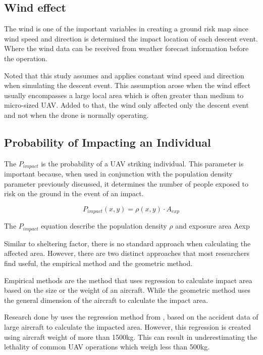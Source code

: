 \documentclass[12pt]{report}
\begin{document}
        \subsection{Wind effect}
        The wind is one of the important variables in creating a ground risk map since wind speed and direction is
        determined the impact location of each descent event. Where the wind data can be received from weather forecast
        information before the operation.
            
        Noted that this study assumes and applies constant wind speed and direction when simulating the descent event.
        This assumption arose when the wind effect usually encompasses a large local area which is often greater than
        medium to micro-sized UAV. Added to that, the wind only affected only the descent event and not when the drone
        is normally operating.
            
        \subsection{Probability of Impacting an Individual}
        The \(P_{impact}\) is the probability of a UAV striking individual. This parameter is important because, when
        used in conjunction with the population density parameter previously discussed, it determines the number of
        people exposed to risk on the ground in the event of an impact.

        \begin{equation}
            P_{impact}(x,y)=\rho(x,y) \cdot A_{exp}
        \end{equation}

        The \(P_{impact}\) equation describe the population density \(\rho\) and exposure area Aexp
            
        Similar to sheltering factor, there is no standard approach when calculating the affected area. However, there
        are two distinct approaches that most researchers find useful, the empirical method and the geometric method.
            
        Empirical methods are the method that uses regression to calculate impact area based on the size or the weight
        of an aircraft. While the geometric method uses the general dimension of the aircraft to calculate the impact
        area.

        Research done by \cite{melnyk_third-party_2014} uses the regression method from \cite{ale_assessment_2000}, based on the accident data of large aircraft to
        calculate the impacted area. However, this regression is created using aircraft weight of more than 1500kg. This
        can result in underestimating the lethality of common UAV operations which weigh less than 500kg.
            
\end{document}
